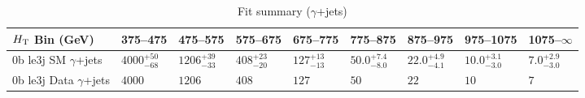 \documentclass[8pt]{article}
\def\scalht{\mbox{$H_{\rm{T}}$}\xspace}
\newcommand\T{\rule{0pt}{2.6ex}}
\begin{document}
\begin{table}[ht!]
\caption{Fit summary ($\gamma$+jets)}
\label{tab:ensemble-summary}
\centering
\begin{tabular}{ lllllllll }

\hline
\scalht Bin (GeV)       & 375--475                       & 475--575                       & 575--675                       & 675--775                       & 775--875                       & 875--975                       & 975--1075                      & 1075--$\infty$                 \\ [1.000000ex]
\hline
0b le3j SM $\gamma$+jets\T & $4000^{+50}_{-68}$             & $1206^{+39}_{-33}$             & $408^{+23}_{-20}$              & $127^{+13}_{-13}$              & $50.0^{+7.4}_{-8.0}$           & $22.0^{+4.9}_{-4.1}$           & $10.0^{+3.1}_{-3.0}$           & $7.0^{+2.9}_{-3.0}$            \\ 
0b le3j Data $\gamma$+jets\T & $4000$                         & $1206$                         & $408$                          & $127$                          & $50$                           & $22$                           & $10$                           & $7$                            \\ 
\hline

\end{tabular}
\end{table}
\end{document}
